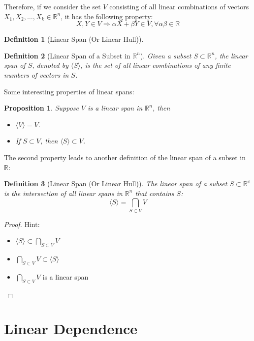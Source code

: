 \documentclass[onecolumn]{ctexart}
\newtheorem{definition}{Definition}
\newtheorem{proposition}{Proposition}
\begin{document}
Therefore, if we consider the set $V$ consisting of all linear combinations of 
vectors $X_1, X_2, \ldots, X_k \in \mathbb{R}^n$, it has the following property:
\[
  X, Y \in V \Rightarrow \alpha X + \beta Y \in V, \forall \alpha \beta \in \mathbb{R}
\]

\begin{definition}[Linear Span (Or Linear Hull)]
  
\end{definition}

\begin{definition}[Linear Span of a Subset in $\mathbb{R}^n$]
  Given a subset $S \subset \mathbb{R}^n$, the linear span of $S$, denoted by 
  $\langle S \rangle$, is the set of all linear combinations of any finite numbers of vectors 
  in $S$.
\end{definition}
Some interesting properties of linear spans:
\begin{proposition}
  Suppose $V$ is a linear span in $\mathbb{R}^n$, then
  \begin{itemize}
    \item $\langle V \rangle = V$.
    \item If $S \subset V$, then $\langle S \rangle \subset V$.
  \end{itemize}
\end{proposition}
The second property leads to another definition of the linear span of a subset in $\mathbb{R}$:
\begin{definition}[Linear Span (Or Linear Hull)]
  The linear span of a subset $S \subset \mathbb{R^n}$ is the intersection of 
  all linear spans in $\mathbb{R}^n$ that contains $S$:
  \[
    \langle S \rangle = \bigcap_{S \subset V} V
  \]
\end{definition}
\begin{proof}
  Hint:
  \begin{itemize}
    \item $\langle S \rangle \subset \bigcap_{S \subset V} V$
    \item $\bigcap_{S \subset V} V \subset \langle S \rangle$
    \item $\bigcap_{S \subset V} V$ is a linear span
  \end{itemize}
\end{proof}

\section{Linear Dependence}
\end{document}
